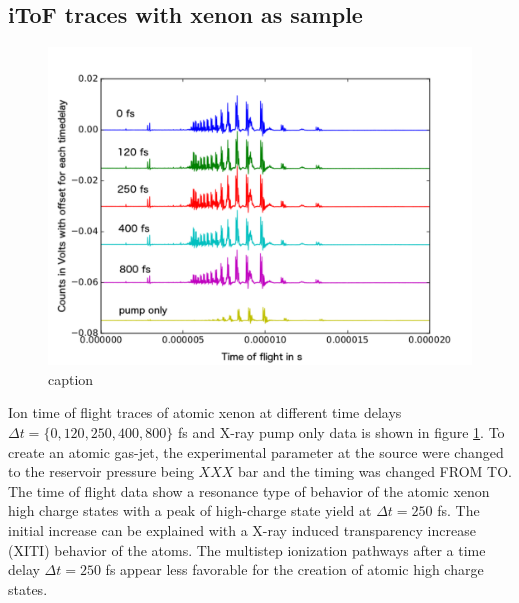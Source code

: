 \subsection{iToF traces with xenon as sample}
\begin{figure}
	\centering
		\includegraphics[width=1.00\textwidth]{images/results/TOF-atomic-xenon.png}
	\caption{caption}
	\label{fig:TOF-atomic-xenon}
\end{figure}
Ion time of flight traces of atomic xenon at different time delays $\Delta t = \{0, 120, 250, 400, 800\}$ fs and X-ray pump only data is shown in figure \ref{fig:TOF-atomic-xenon}. To create an atomic gas-jet, the experimental parameter at the source were changed to the reservoir pressure being $XXX$ bar and the timing was changed FROM TO. The time of flight data show a resonance type of behavior of the atomic xenon high charge states with a peak of high-charge state yield at $\Delta t = 250$ fs. The initial increase can be explained with a X-ray induced transparency increase (XITI) \citep{Schorb-2012-PRL} behavior of the atoms. The multistep ionization pathways after a time delay $\Delta t = 250$ fs appear less favorable for the creation of atomic high charge states.\\
